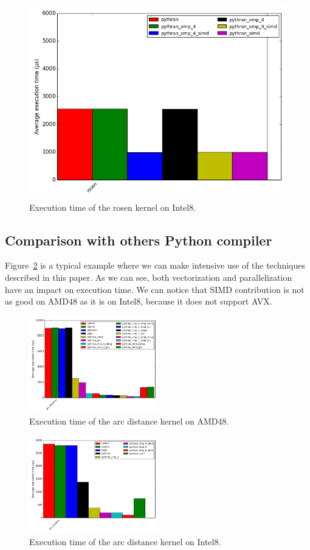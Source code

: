 \documentclass[10pt, preprint]{sigplanconf}
\begin{document}
\begin{figure}[t]
\centering
\includegraphics[width=.5\textwidth]{rosen_intel8.png}
\caption{Execution time of the rosen kernel on Intel8.}
\label{fig:rosenintel8}
\end{figure}


\subsection{Comparison with others Python compiler}

Figure~\ref{fig:arc_distance} is a typical example where we can make intensive
use of the techniques described in this paper. As we can see, both vectorization
and parallelization have an impact on execution time. We can notice that SIMD
contribution is not as good on AMD48 as it is on Intel8, because it does not
support AVX.

\begin{figure}[t]
\centering
\includegraphics[width=0.5\textwidth]{arc_distance_amd48.png}
\caption{Execution time of the arc distance kernel on AMD48.}
\label{fig:arc_distance}
\end{figure}

\begin{figure}[t]
\centering
\includegraphics[width=0.5\textwidth]{arc_distance_intel8.png}
\caption{Execution time of the arc distance kernel on Intel8.}
\label{fig:arc_distance_intel8}
\end{figure}
\end{document}

